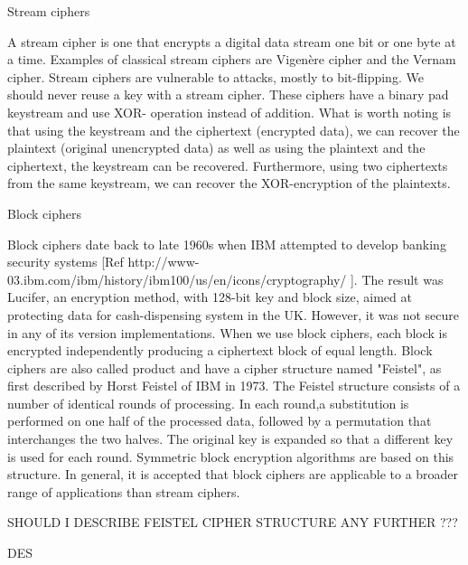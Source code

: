 Stream ciphers

A stream cipher is one that encrypts a digital data stream one bit or one byte at a time. Examples of classical stream ciphers are Vigenère cipher and the Vernam cipher. Stream ciphers are vulnerable to attacks, mostly to bit-flipping. We should never reuse a key with a stream cipher. These ciphers have a binary pad keystream and use XOR- operation instead of addition. What is worth noting is that using the keystream and the ciphertext (encrypted data), we can recover the plaintext (original unencrypted data) as well as using the plaintext and the ciphertext, the keystream can be recovered. Furthermore, using two ciphertexts from the same keystream, we can recover the XOR-encryption of the plaintexts.

Block ciphers

Block ciphers date back to late 1960s when IBM attempted to develop banking security systems [Ref http://www-03.ibm.com/ibm/history/ibm100/us/en/icons/cryptography/ ]. The result was Lucifer, an encryption method, with 128-bit key and block size, aimed at protecting data for cash-dispensing system in the UK. However, it was not secure in any of its version implementations. 
When we use block ciphers, each block is encrypted independently producing a ciphertext block of equal length. Block ciphers are also called product and have a cipher structure named "Feistel", as first described by Horst Feistel of IBM in 1973. The Feistel structure consists of a number of identical rounds of processing. In each round,a substitution is performed on one half of the processed data, followed by a permutation that interchanges the two halves. The original key is expanded so that a different key is used for each round. Symmetric block encryption algorithms are based on this structure. 
In general, it is accepted that block ciphers are applicable to a broader range of applications than stream ciphers. 


SHOULD I DESCRIBE FEISTEL CIPHER STRUCTURE ANY FURTHER ???

DES

